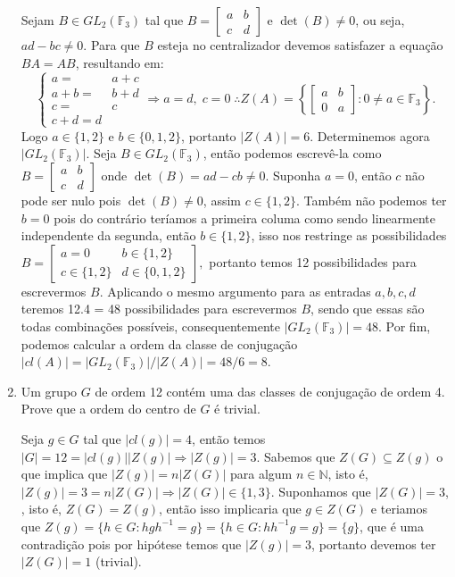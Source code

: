 \documentclass{article}
\begin{document}
\begin{enumerate}
		Sejam $B \in GL_{2}(\mathbb{F}_{3})$ tal que 
		$
		B = 
		\left[
		\begin{array}{cc}
		a & b \\
		c & d
		\end{array}
		\right]
		$
		e $\det(B) \neq 0$, ou seja, $ad-bc \neq 0$. Para que $B$ esteja no centralizador devemos satisfazer a equação $BA= AB$, resultando em:
		$$
		\left\{
		\begin{aligned}
		a =& a+c 
		\\
		a+b =& b + d
		\\
		c =& c
		\\
		c+d = d
		\end{aligned}
		\right.
		\Rightarrow
		a = d, \; c = 0 \; 
		\therefore Z(A) = 
		\left\{
		\left[
		\begin{array}{cc}
		a & b \\
		0 & a
		\end{array}
		\right]
		: 0 \neq a \in \mathbb{F}_{3}\right\}.
		$$
		Logo $a \in \{1,2\}$ e $b \in \{0,1,2\}$, portanto $|Z(A)| = 6$. Determinemos agora $|GL_{2}(\mathbb{F}_{3})|$. Seja $B \in GL_{2}(\mathbb{F}_{3})$, então podemos escrevê-la como
		$
		B = 
		\left[
		\begin{array}{cc}
		a & b \\
		c & d
		\end{array}
		\right]
		$
		onde $\det(B) = ad-cb \neq 0$. Suponha $a =0$, então $c$ não pode ser nulo pois $\det(B) \neq 0$, assim $c \in \{1,2\}$. Também não podemos ter $b=0$ pois do contrário teríamos a primeira columa como sendo linearmente independente da segunda, então $b \in \{1,2\}$, isso nos restringe as possibilidades
		$
		B = 
		\left[
		\begin{array}{cc}
		a=0 & b \in \{1,2\} \\
		c \in \{1,2\} & d \in \{0,1,2\}
		\end{array}
		\right],
		$
		portanto temos 12 possibilidades para escrevermos $B$. Aplicando o mesmo argumento para as entradas $a, b, c, d$ teremos 12.4 = 48 possibilidades para escrevermos $B$, sendo que essas são todas combinações possíveis, consequentemente $|GL_{2}(\mathbb{F}_{3})| = 48$. Por fim, podemos calcular a ordem da classe de conjugação $|cl(A)| = |GL_{2}(\mathbb{F}_{3})|/|Z(A)| = 48/6 = 8$.
		
		\item Um grupo $G$ de ordem 12 contém uma das classes de conjugação de ordem 4. Prove que a ordem do centro de $G$ é trivial.
		
		Seja $g \in G$ tal que $|cl(g)| = 4$, então temos $|G| = 12 = |cl(g)||Z(g)| \Rightarrow |Z(g)| = 3$. Sabemos que $Z(G) \subseteq Z(g)$ o que implica que $|Z(g)| = n|Z(G)|$ para algum $n \in \mathbb{N}$, isto é, $|Z(g)| = 3 = n|Z(G)| \Rightarrow |Z(G)| \in \{1,3\}$. Suponhamos que $|Z(G)|=3$, , isto é, $Z(G) = Z(g)$, então isso implicaria que $g \in Z(G)$ e teriamos que $Z(g) = \{h \in G: hgh^{-1}=g \} = \{h \in G: hh^{-1}g=g \} = \{g\}$, que é uma contradição pois por hipótese temos que $|Z(g)| = 3$, portanto devemos ter $|Z(G)| = 1$ (trivial).
		

\end{enumerate}
\end{document}
